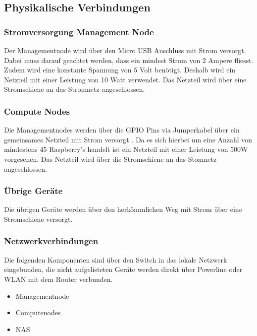 \subsection{Physikalische Verbindungen}

\subsubsection{Stromversorgung Management Node}
Der Managementnode wird über den Micro USB Anschluss mit Strom versorgt. Dabei muss darauf geachtet werden, dass ein mindest Strom von 2 Ampere fliesst. Zudem wird eine konstante Spannung von 5 Volt benötigt. Deshalb wird ein Netzteil mit einer Leistung von 10 Watt verwendet. Das Netzteil wird über eine Stromschiene an das Stromnetz angeschlossen.

\subsubsection{Compute Nodes}
Die Managementnodes werden über die GPIO Pins via Jumperkabel über ein gemeinsames Netzteil mit Strom versorgt . Da es sich hierbei um eine Anzahl von mindestens 45 Raspberry's handelt ist ein Netzteil mit einer Leistung von 500W vorgesehen. Das Netzteil wird über die Stromschiene an das Stomnetz angeschlossen.


\subsubsection{Übrige Geräte}
Die übrigen Geräte werden über den herkömmlichen Weg mit Strom über eine Stromschiene versorgt.

\subsubsection{Netzwerkverbindungen}
Die folgenden Komponenten sind über den Switch in das lokale Netzwerk eingebunden, die nicht aufgelisteten Geräte werden direkt über Powerline oder WLAN mit dem Router verbunden.
\begin{itemize}
\item Managementnode
\item Computenodes
\item NAS
\end{itemize}


